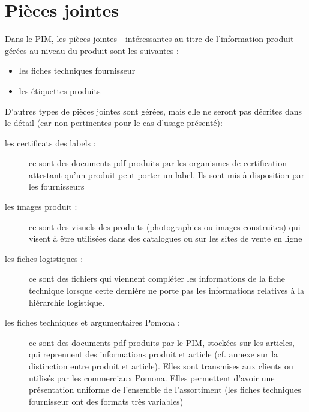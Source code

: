 

        \section{Pièces jointes}
            \label{pieces_jointes}

            Dans le PIM, les pièces jointes - intéressantes au titre de l'information produit - gérées au niveau du produit sont les suivantes :
            \begin{itemize}
                \item les fiches techniques fournisseur
                \item les étiquettes produits
            \end{itemize}
    
            D'autres types de pièces jointes sont gérées, mais elle ne seront pas décrites dans le détail (car non pertinentes pour le cas d'usage présenté):
            \begin{description}
                \item[les certificats des labels : ] ce sont des documents pdf produits par les organismes de certification attestant qu'un produit peut porter un label. Ils sont mis à disposition par les fournisseurs
                \item[les images produit : ] ce sont des visuels des produits (photographies ou images construites) qui visent à être utilisées dans des catalogues ou sur les sites de vente en ligne
                \item[les fiches logistiques : ] ce sont des fichiers qui viennent compléter les informations de la fiche technique lorsque cette dernière ne porte pas les informations relatives à la hiérarchie logistique. 
                \item[les fiches techniques et argumentaires Pomona : ] ce sont des documents pdf produits par le PIM, stockées sur les articles, qui reprennent des informations produit et article (cf. annexe  sur la distinction entre produit et article). Elles sont transmises aux clients ou utilisés par les commerciaux Pomona.
                Elles permettent d'avoir une présentation uniforme de l'ensemble de l'assortiment (les fiches techniques fournisseur ont des formats très variables)
            \end{description}

